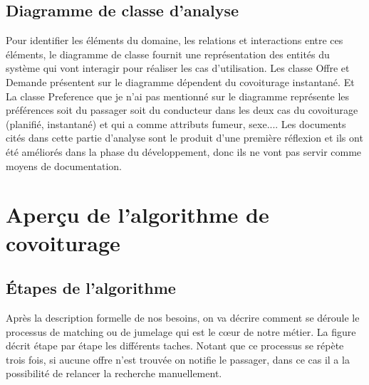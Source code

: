 \subsection{Diagramme de classe d'analyse} %
Pour identifier les éléments du domaine, les relations et interactions entre ces éléments, le diagramme de classe fournit une représentation des entités du système qui vont interagir pour réaliser les cas d'utilisation.\newline
Les classe Offre et Demande présentent sur le diagramme dépendent du covoiturage instantané. Et La classe Preference que je n'ai pas mentionné sur le diagramme représente les préférences soit du passager soit du conducteur dans les deux cas du covoiturage (planifié, instantané) et qui a comme attributs fumeur, sexe....\newline
Les documents cités dans cette partie d'analyse sont le produit d'une première réflexion et ils ont été améliorés dans la phase du développement, donc ils ne vont pas servir comme moyens de documentation.

\section{Aperçu de l'algorithme de covoiturage} %
\label{sec:Aperçu de l'algorithme de covoiturage}
\subsection{Étapes de l'algorithme} %
Après la description formelle de nos besoins, on va décrire comment se déroule le processus de matching ou de jumelage qui est le cœur de notre métier.
\newline
La figure  décrit étape par étape les différents taches. Notant que ce processus se répète trois fois, si aucune offre n'est trouvée on notifie le passager, dans ce cas il a la possibilité de relancer la recherche manuellement.

